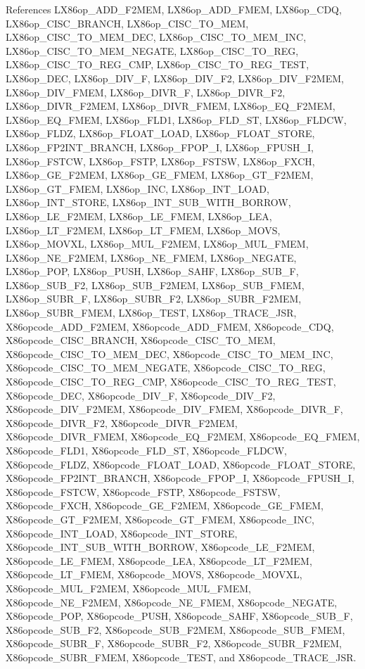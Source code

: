 References LX86op\_\-ADD\_\-F2MEM, LX86op\_\-ADD\_\-FMEM, LX86op\_\-CDQ, LX86op\_\-CISC\_\-BRANCH, LX86op\_\-CISC\_\-TO\_\-MEM, LX86op\_\-CISC\_\-TO\_\-MEM\_\-DEC, LX86op\_\-CISC\_\-TO\_\-MEM\_\-INC, LX86op\_\-CISC\_\-TO\_\-MEM\_\-NEGATE, LX86op\_\-CISC\_\-TO\_\-REG, LX86op\_\-CISC\_\-TO\_\-REG\_\-CMP, LX86op\_\-CISC\_\-TO\_\-REG\_\-TEST, LX86op\_\-DEC, LX86op\_\-DIV\_\-F, LX86op\_\-DIV\_\-F2, LX86op\_\-DIV\_\-F2MEM, LX86op\_\-DIV\_\-FMEM, LX86op\_\-DIVR\_\-F, LX86op\_\-DIVR\_\-F2, LX86op\_\-DIVR\_\-F2MEM, LX86op\_\-DIVR\_\-FMEM, LX86op\_\-EQ\_\-F2MEM, LX86op\_\-EQ\_\-FMEM, LX86op\_\-FLD1, LX86op\_\-FLD\_\-ST, LX86op\_\-FLDCW, LX86op\_\-FLDZ, LX86op\_\-FLOAT\_\-LOAD, LX86op\_\-FLOAT\_\-STORE, LX86op\_\-FP2INT\_\-BRANCH, LX86op\_\-FPOP\_\-I, LX86op\_\-FPUSH\_\-I, LX86op\_\-FSTCW, LX86op\_\-FSTP, LX86op\_\-FSTSW, LX86op\_\-FXCH, LX86op\_\-GE\_\-F2MEM, LX86op\_\-GE\_\-FMEM, LX86op\_\-GT\_\-F2MEM, LX86op\_\-GT\_\-FMEM, LX86op\_\-INC, LX86op\_\-INT\_\-LOAD, LX86op\_\-INT\_\-STORE, LX86op\_\-INT\_\-SUB\_\-WITH\_\-BORROW, LX86op\_\-LE\_\-F2MEM, LX86op\_\-LE\_\-FMEM, LX86op\_\-LEA, LX86op\_\-LT\_\-F2MEM, LX86op\_\-LT\_\-FMEM, LX86op\_\-MOVS, LX86op\_\-MOVXL, LX86op\_\-MUL\_\-F2MEM, LX86op\_\-MUL\_\-FMEM, LX86op\_\-NE\_\-F2MEM, LX86op\_\-NE\_\-FMEM, LX86op\_\-NEGATE, LX86op\_\-POP, LX86op\_\-PUSH, LX86op\_\-SAHF, LX86op\_\-SUB\_\-F, LX86op\_\-SUB\_\-F2, LX86op\_\-SUB\_\-F2MEM, LX86op\_\-SUB\_\-FMEM, LX86op\_\-SUBR\_\-F, LX86op\_\-SUBR\_\-F2, LX86op\_\-SUBR\_\-F2MEM, LX86op\_\-SUBR\_\-FMEM, LX86op\_\-TEST, LX86op\_\-TRACE\_\-JSR, X86opcode\_\-ADD\_\-F2MEM, X86opcode\_\-ADD\_\-FMEM, X86opcode\_\-CDQ, X86opcode\_\-CISC\_\-BRANCH, X86opcode\_\-CISC\_\-TO\_\-MEM, X86opcode\_\-CISC\_\-TO\_\-MEM\_\-DEC, X86opcode\_\-CISC\_\-TO\_\-MEM\_\-INC, X86opcode\_\-CISC\_\-TO\_\-MEM\_\-NEGATE, X86opcode\_\-CISC\_\-TO\_\-REG, X86opcode\_\-CISC\_\-TO\_\-REG\_\-CMP, X86opcode\_\-CISC\_\-TO\_\-REG\_\-TEST, X86opcode\_\-DEC, X86opcode\_\-DIV\_\-F, X86opcode\_\-DIV\_\-F2, X86opcode\_\-DIV\_\-F2MEM, X86opcode\_\-DIV\_\-FMEM, X86opcode\_\-DIVR\_\-F, X86opcode\_\-DIVR\_\-F2, X86opcode\_\-DIVR\_\-F2MEM, X86opcode\_\-DIVR\_\-FMEM, X86opcode\_\-EQ\_\-F2MEM, X86opcode\_\-EQ\_\-FMEM, X86opcode\_\-FLD1, X86opcode\_\-FLD\_\-ST, X86opcode\_\-FLDCW, X86opcode\_\-FLDZ, X86opcode\_\-FLOAT\_\-LOAD, X86opcode\_\-FLOAT\_\-STORE, X86opcode\_\-FP2INT\_\-BRANCH, X86opcode\_\-FPOP\_\-I, X86opcode\_\-FPUSH\_\-I, X86opcode\_\-FSTCW, X86opcode\_\-FSTP, X86opcode\_\-FSTSW, X86opcode\_\-FXCH, X86opcode\_\-GE\_\-F2MEM, X86opcode\_\-GE\_\-FMEM, X86opcode\_\-GT\_\-F2MEM, X86opcode\_\-GT\_\-FMEM, X86opcode\_\-INC, X86opcode\_\-INT\_\-LOAD, X86opcode\_\-INT\_\-STORE, X86opcode\_\-INT\_\-SUB\_\-WITH\_\-BORROW, X86opcode\_\-LE\_\-F2MEM, X86opcode\_\-LE\_\-FMEM, X86opcode\_\-LEA, X86opcode\_\-LT\_\-F2MEM, X86opcode\_\-LT\_\-FMEM, X86opcode\_\-MOVS, X86opcode\_\-MOVXL, X86opcode\_\-MUL\_\-F2MEM, X86opcode\_\-MUL\_\-FMEM, X86opcode\_\-NE\_\-F2MEM, X86opcode\_\-NE\_\-FMEM, X86opcode\_\-NEGATE, X86opcode\_\-POP, X86opcode\_\-PUSH, X86opcode\_\-SAHF, X86opcode\_\-SUB\_\-F, X86opcode\_\-SUB\_\-F2, X86opcode\_\-SUB\_\-F2MEM, X86opcode\_\-SUB\_\-FMEM, X86opcode\_\-SUBR\_\-F, X86opcode\_\-SUBR\_\-F2, X86opcode\_\-SUBR\_\-F2MEM, X86opcode\_\-SUBR\_\-FMEM, X86opcode\_\-TEST, and X86opcode\_\-TRACE\_\-JSR.

